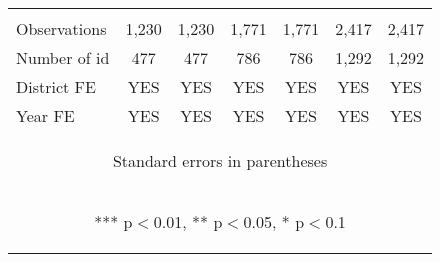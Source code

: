 \begin{center}
\begin{tabular}{lcccccc}
\vspace{4pt} & \begin{footnotesize}\end{footnotesize} & \begin{footnotesize}\end{footnotesize} & \begin{footnotesize}\end{footnotesize} & \begin{footnotesize}\end{footnotesize} & \begin{footnotesize}\end{footnotesize} & \begin{footnotesize}\end{footnotesize} \\
Observations & 1,230 & 1,230 & 1,771 & 1,771 & 2,417 & 2,417 \\
Number of id & 477 & 477 & 786 & 786 & 1,292 & 1,292 \\
District FE & YES & YES & YES & YES & YES & YES \\
 Year FE & YES & YES & YES & YES & YES & YES \\ \hline
\multicolumn{7}{c}{\begin{footnotesize} Standard errors in parentheses\end{footnotesize}} \\
\multicolumn{7}{c}{\begin{footnotesize} *** p$<$0.01, ** p$<$0.05, * p$<$0.1\end{footnotesize}} \\
\end{tabular}
\end{center}
